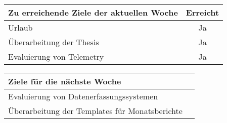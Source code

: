 \begin{tabularx}{\textwidth}{Xc}
    \arrayrulecolor{OliveGreen}
    \toprule
    {\bfseries Zu erreichende Ziele der aktuellen Woche} & {\bfseries Erreicht} \\
    \midrule[2pt]
    Urlaub                                               &Ja                    \\
    \rowcolor{OliveGreen!15}
    Überarbeitung der Thesis                             &Ja                    \\
    \rowcolor{White}
    Evaluierung von Telemetry                            &Ja                    \\
    \bottomrule[2pt]
\end{tabularx}
%
\vspace{1cm}
%
\begin{tabularx}{\textwidth}{Xc}
    \arrayrulecolor{OliveGreen}
    \toprule
    {\bfseries Ziele für die nächste Woche}              &                      \\
    \midrule[2pt]
    Evaluierung von Datenerfassungssystemen              &                      \\
    \rowcolor{OliveGreen!15}
    Überarbeitung der Templates für Monatsberichte       &                      \\
\end{tabularx}
